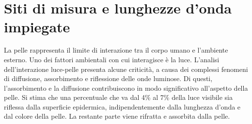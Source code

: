 \section{Siti di misura e lunghezze d'onda impiegate}\label{cap:sitimisura}
La pelle rappresenta il limite di interazione tra il corpo umano e l'ambiente esterno. Uno dei fattori ambientali con cui interagisce è la luce. L'analisi dell'interazione luce-pelle presenta alcune criticità, a causa dei complessi fenomeni di diffusione, assorbimento e riflessione  delle onde luminose. Di questi, l'assorbimento e la diffusione contribuiscono in modo significativo all'aspetto della pelle. Si stima che una percentuale che va dal 4\% al 7\% della luce visibile sia riflessa dalla superficie epidermica, indipendentemente dalla lunghezza d'onda e dal colore della pelle. La restante parte viene rifratta e assorbita dalla pelle. 
\pagebreak

